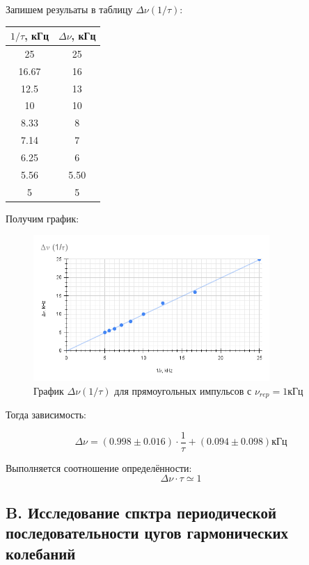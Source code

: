 \documentclass[11pt]{article}
\begin{document}
Запишем резульаты в таблицу \( \Delta\nu(1/\tau) \):


\begin{table}[H]
    \centering
    \label{tab_dnu_tau}
    \begin{tabular}{|c|c|}
        \hline
        \(1/\tau\), кГц & \(\Delta\nu\), кГц \\\hline
        25    & 25   \\\hline
        16.67 & 16   \\\hline
        12.5  & 13   \\\hline
        10    & 10   \\\hline
        8.33  & 8    \\\hline
        7.14  & 7    \\\hline
        6.25  & 6    \\\hline
        5.56  & 5.50 \\\hline
        5     & 5   \\\hline
    \end{tabular}
\end{table}

Получим график:
\begin{figure}[H]
    \centering
    \includegraphics[width=0.8\textwidth]{graf1.png}
    \caption{График \( \Delta\nu(1/\tau) \) для прямоугольных импульсов с \( \nu_{rep} = 1кГц \)}
    \label{pic_dnu_tau}
\end{figure}
Тогда зависимость:

    \[ \Delta\nu = (0.998 \pm 0.016) \cdot \frac{1}{\tau} + (0.094 \pm 0.098) кГц \]

Выполняется соотношение определённости:
\[ \Delta\nu\cdot\tau \simeq 1 \]

\subsection{B. Исследование спктра периодической последовательности цугов гармонических колебаний}
\end{document}
